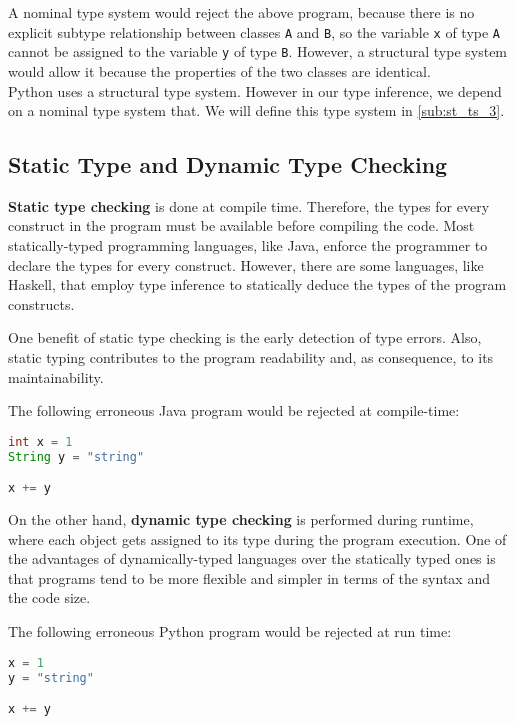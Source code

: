 A nominal type system would reject the above program, because there is no explicit subtype relationship between classes \lstinline|A| and \lstinline|B|, so the variable \lstinline|x| of type \lstinline|A| cannot be assigned to the variable \lstinline|y| of type \lstinline|B|. However, a structural type system would allow it because the properties of the two classes are identical. \\

Python uses a structural type system. However in our type inference, we depend on a nominal type system that. We will define this type system in \ref{sub:st_ts_3}.

\subsection{Static Type and Dynamic Type Checking}

\textbf{Static type checking} is done at compile time. Therefore, the types for every construct in the program must be available before compiling the code. Most statically-typed programming languages, like Java, enforce the programmer to declare the types for every construct. However, there are some languages, like Haskell, that employ type inference to statically deduce the types of the program constructs.

One benefit of static type checking is the early detection of type errors. Also, static typing contributes to the program readability and, as consequence, to its maintainability.

The following erroneous Java program would be rejected at compile-time:
\begin{lstlisting}[language=java]
int x = 1
String y = "string"

x += y
\end{lstlisting}

On the other hand, \textbf{dynamic type checking} is performed during runtime, where each object gets assigned to its type during the program execution. One of the advantages of dynamically-typed languages over the statically typed ones is that programs tend to be more flexible and simpler in terms of the syntax and the code size.

The following erroneous Python program would be rejected at run time:
\begin{lstlisting}[language=python]
x = 1
y = "string"

x += y
\end{lstlisting}

